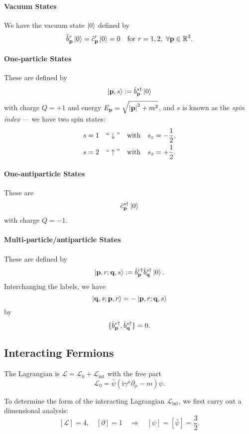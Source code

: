 \documentclass[a4paper,11pt]{article}
\begin{document}
	\paragraph{Vacuum States} We have the vacuum state $\ket{0}$ defined by 
	\[
		\hat b^r _{\vb p} \ket{0} = \hat c^r _{\vb p}\ket{0} = 0 \quad \text{for } r=1,2,\ \forall \vb p \in \mathbb{R}^3.
	\]

	\paragraph{One-particle States} These are defined by
	\[
		\ket{\vb p,s} := \hat b^{s\dagger}_{\vb p} \ket{0} 
	\]
	with charge $Q = +1$ and energy $E _{\vb p} = \sqrt{\abs{\vb p}^2 + m^2}$, and $s$ is known as the \emph{spin index} --- we have two spin states:
	\begin{align*}
		s = 1 &\quad ``\downarrow" \quad \text{with}\quad s_z = - \frac{1}{2},\\
		s = 2 &\quad ``\uparrow" \quad \text{with} \quad s_z = + \frac{1}{2}.
	\end{align*}
	
	\paragraph{One-antiparticle States} These are 
	\[
		\hat c^{s\dagger}_{\vb p}\ket{0}
	\]
	with charge $Q = -1$.

	\paragraph{Multi-particle/antiparticle States} These are defined by 
	\[
		\ket{\vb p, r; \vb q, s} := \hat b^{r\dagger}_{\vb p}\hat b^{s\dagger}_{\vb q} \ket{0}.
	\]
	Interchanging the labels, we have
	\[
		\ket{\vb q, s ; \vb p, r} = - \ket{\vb p, r ; \vb q, s}
	\]
	by
	\[
		\{\hat b^{r\dagger} _{\vb p}, \hat b^{s\dagger}_{\vb q}\} = 0.
	\]
	
	\subsection{Interacting Fermions}

	The Lagrangian is $\mathcal{L} = \mathcal{L}_0 + \mathcal{L} _{\text{int}}$ with the free part 
	\[
		\mathcal{L}_0 = \bar \psi (\mathrm{i} \gamma^\mu \partial_\mu - m) \psi.
	\]
	
	To determine the form of the interacting Lagrangian $\mathcal{L} _{\text{int}}$, we first carry out a dimensional analysis:
	\[
		[\mathcal{L}] = 4, \quad [\partial] = 1 \quad \Rightarrow \quad [\psi] = [\bar{\psi}] = \frac{3}{2}.
	\]
\end{document}
